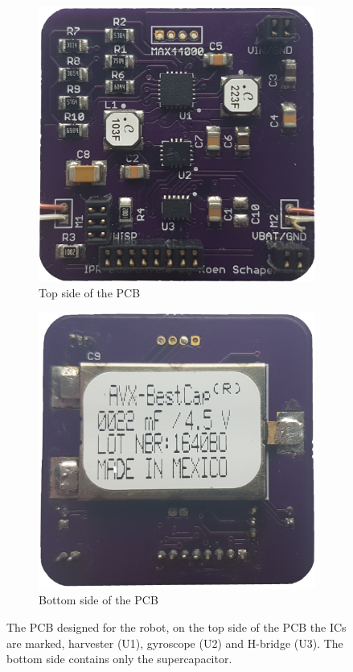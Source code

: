 \begin{figure}[h!]
	\centering
	\begin{subfigure}[b]{0.45\textwidth}
		\includegraphics[width=\textwidth]{pics/pcb_front.jpg}
		\caption{Top side of the PCB}
		\label{fig:pcb_robot_front}
	\end{subfigure}
	\qquad
	\begin{subfigure}[b]{0.45\textwidth}
		\includegraphics[width=\textwidth]{pics/pcb_back.jpg}
		\caption{Bottom side of the PCB}
		\label{fig:pcb_robot_back}
	\end{subfigure}
	\caption{The PCB designed for the robot, on the top side of the PCB the ICs are marked, harvester (U1), gyroscope (U2) and H-bridge (U3). The bottom side contains only the supercapacitor.}
	\label{fig:pcb_robot}
\end{figure}

